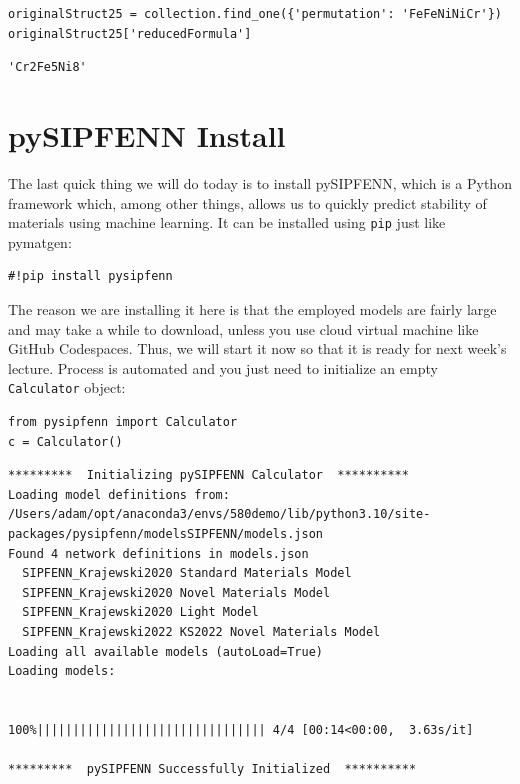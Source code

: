 \begin{verbatim}
originalStruct25 = collection.find_one({'permutation': 'FeFeNiNiCr'})
originalStruct25['reducedFormula']
\end{verbatim}

\begin{verbatim}
'Cr2Fe5Ni8'
\end{verbatim}

\hypertarget{pysipfenn-install}{%
\section{pySIPFENN Install}\label{pysipfenntutorial:pysipfenn-install}}

The last quick thing we will do today is to install pySIPFENN, which is
a Python framework which, among other things, allows us to quickly
predict stability of materials using machine learning. It can be
installed using \texttt{pip} just like pymatgen:

\begin{verbatim}
#!pip install pysipfenn
\end{verbatim}

The reason we are installing it here is that the employed models are
fairly large and may take a while to download, unless you use cloud
virtual machine like GitHub Codespaces. Thus, we will start it now so
that it is ready for next week's lecture. Process is automated and you
just need to initialize an empty \texttt{Calculator}
object:

\begin{verbatim}
from pysipfenn import Calculator
c = Calculator()
\end{verbatim}

\begin{verbatim}
*********  Initializing pySIPFENN Calculator  **********
Loading model definitions from: /Users/adam/opt/anaconda3/envs/580demo/lib/python3.10/site-packages/pysipfenn/modelsSIPFENN/models.json
Found 4 network definitions in models.json
  SIPFENN_Krajewski2020 Standard Materials Model
  SIPFENN_Krajewski2020 Novel Materials Model
  SIPFENN_Krajewski2020 Light Model
  SIPFENN_Krajewski2022 KS2022 Novel Materials Model
Loading all available models (autoLoad=True)
Loading models:


100%|||||||||||||||||||||||||||||||| 4/4 [00:14<00:00,  3.63s/it]

*********  pySIPFENN Successfully Initialized  **********
\end{verbatim}


